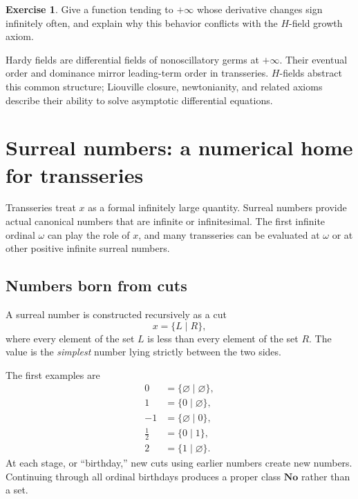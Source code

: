 \documentclass[11pt,openany]{book}
\theoremstyle{definition}
\newtheorem{exercise}{Exercise}[chapter]
\theoremstyle{plain}
\theoremstyle{remark}
\begin{document}
\begin{exercise}
Give a function tending to $+\infty$ whose derivative changes sign infinitely often, and explain why this behavior conflicts with the $H$-field growth axiom.
\end{exercise}

\begin{summarybox}
Hardy fields are differential fields of nonoscillatory germs at $+\infty$. Their eventual order and dominance mirror leading-term order in transseries. $H$-fields abstract this common structure; Liouville closure, newtonianity, and related axioms describe their ability to solve asymptotic differential equations.
\end{summarybox}


\chapter{Surreal numbers: a numerical home for transseries}\label{ch:surreals}

Transseries treat $x$ as a formal infinitely large quantity. Surreal numbers provide actual canonical numbers that are infinite or infinitesimal. The first infinite ordinal $\omega$ can play the role of $x$, and many transseries can be evaluated at $\omega$ or at other positive infinite surreal numbers.

\section{Numbers born from cuts}

A surreal number is constructed recursively as a cut
\begin{equation}\label{eq:surreal-cut}
 x=\{L\mid R\},
\end{equation}
where every element of the set $L$ is less than every element of the set $R$. The value is the \emph{simplest} number lying strictly between the two sides.

The first examples are
\begin{align*}
 0&=\{\varnothing\mid\varnothing\},\\
 1&=\{0\mid\varnothing\},\\
 -1&=\{\varnothing\mid0\},\\
 \frac12&=\{0\mid1\},\\
 2&=\{1\mid\varnothing\}.
\end{align*}
At each stage, or ``birthday,'' new cuts using earlier numbers create new numbers. Continuing through all ordinal birthdays produces a proper class $\mathbf{No}$ rather than a set.
\end{document}
